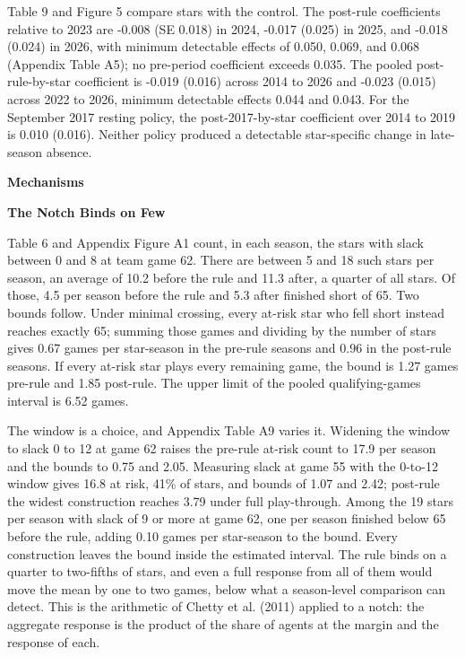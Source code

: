 \documentclass[12pt]{article}
\newcommand{\lone}[1]{\par\medskip\noindent\begin{center}\textbf{#1}\end{center}\par\nopagebreak}
\newcommand{\ltwo}[1]{\par\medskip\noindent\textbf{#1}\par\nopagebreak}
\begin{document}
Table 9 and Figure 5 compare stars with the control. The post-rule coefficients relative to 2023 are -0.008 (SE 0.018) in 2024, -0.017 (0.025) in 2025, and -0.018 (0.024) in 2026, with minimum detectable effects of 0.050, 0.069, and 0.068 (Appendix Table A5); no pre-period coefficient exceeds 0.035. The pooled post-rule-by-star coefficient is -0.019 (0.016) across 2014 to 2026 and -0.023 (0.015) across 2022 to 2026, minimum detectable effects 0.044 and 0.043. For the September 2017 resting policy, the post-2017-by-star coefficient over 2014 to 2019 is 0.010 (0.016). Neither policy produced a detectable star-specific change in late-season absence.



\lone{Mechanisms}



\ltwo{The Notch Binds on Few}


Table 6 and Appendix Figure A1 count, in each season, the stars with slack between 0 and 8 at team game 62. There are between 5 and 18 such stars per season, an average of 10.2 before the rule and 11.3 after, a quarter of all stars. Of those, 4.5 per season before the rule and 5.3 after finished short of 65. Two bounds follow. Under minimal crossing, every at-risk star who fell short instead reaches exactly 65; summing those games and dividing by the number of stars gives 0.67 games per star-season in the pre-rule seasons and 0.96 in the post-rule seasons. If every at-risk star plays every remaining game, the bound is 1.27 games pre-rule and 1.85 post-rule. The upper limit of the pooled qualifying-games interval is 6.52 games.

The window is a choice, and Appendix Table A9 varies it. Widening the window to slack 0 to 12 at game 62 raises the pre-rule at-risk count to 17.9 per season and the bounds to 0.75 and 2.05. Measuring slack at game 55 with the 0-to-12 window gives 16.8 at risk, 41\% of stars, and bounds of 1.07 and 2.42; post-rule the widest construction reaches 3.79 under full play-through. Among the 19 stars per season with slack of 9 or more at game 62, one per season finished below 65 before the rule, adding 0.10 games per star-season to the bound. Every construction leaves the bound inside the estimated interval. The rule binds on a quarter to two-fifths of stars, and even a full response from all of them would move the mean by one to two games, below what a season-level comparison can detect. This is the arithmetic of Chetty et al. (2011) applied to a notch: the aggregate response is the product of the share of agents at the margin and the response of each.
\end{document}
